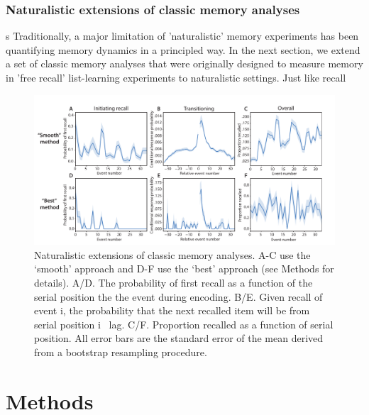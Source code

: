 \documentclass[a4paper,man,natbib,floatsintext]{apa6}
\newcommand{\rpm}{\raisebox{.2ex}{$\scriptstyle\pm$}}
\begin{document}
\subsubsection{Naturalistic extensions of classic memory analyses}
s
Traditionally, a major limitation of 'naturalistic' memory experiments has been quantifying memory dynamics in a principled way.
In the next section, we extend a set of classic memory analyses that were originally designed to measure memory in 'free recall' list-learning experiments to naturalistic settings. Just like recall


\begin{figure}[t!]
\centering
\includegraphics[width=1\textwidth]{figs/3_behav_eventseg.pdf}
\caption{\label{fig:behav}Naturalistic extensions of classic memory analyses. A-C use the `smooth' approach and D-F use the `best' approach (see Methods for details). A/D. The probability of first recall as a function of the serial position the the event during encoding. B/E. Given recall of event i, the probability that the next recalled item will be from serial position i \rpm~lag. C/F. Proportion recalled as a function of serial position. All error bars are the standard error of the mean derived from a bootstrap resampling procedure.
}
\end{figure}

\section{Methods}
\label{sec:methods}
\end{document}
